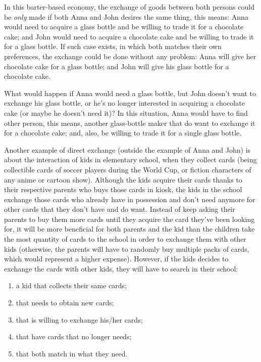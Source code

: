 \documentclass[12pt,a4paper,twoside]{book}
\begin{document}
In this barter-based economy, the exchange of goods between both persons could be \textit{only} made if both Anna and John desires the same thing, this means: Anna would need to acquire a glass bottle and be willing to trade it for a chocolate cake; and John would need to acquire a chocolate cake and be willing to trade it for a glass bottle. If such case exists, in which both matches their own preferences, the exchange could be done without any problem: Anna will give her chocolate cake for a glass bottle; and John will give his glass bottle for a chocolate cake.

What would happen if Anna would need a glass bottle, but John doesn't want to exchange his glass bottle, or he's no longer interested in acquiring a chocolate cake (or maybe he doesn't need it)? In this situation, Anna would have to find other person, this means, another glass-bottle maker that do want to exchange it for a chocolate cake; and, also, be willing to trade it for a single glass bottle.

Another example of direct exchange (outside the example of Anna and John) is about the interaction of kids in elementary school, when they collect cards (being collectible cards of soccer players during the World Cup, or fiction characters of any anime or cartoon show). Although the kids acquire their cards thanks to their respective parents who buys those cards in kiosk, the kids in the school exchange those cards who already have in possession and don't need anymore for other cards that they don't have and do want. Instead of keep asking their parents to buy them more cards until they acquire the card they've been looking for, it will be more beneficial for both parents and the kid than the children take the most quantity of cards to the school in order to exchange them with other kids (otherwise, the parents will have to randomly buy multiple packs of cards, which would represent a higher expense). However, if the kids decides to exchange the cards with other kids, they will have to search in their school:

\begin{enumerate}
\item a kid that collects their same cards;
\item that needs to obtain new cards;
\item that is willing to exchange his/her cards;
\item that have cards that no longer needs;
\item that both match in what they need.
\end{enumerate}
\end{document}
